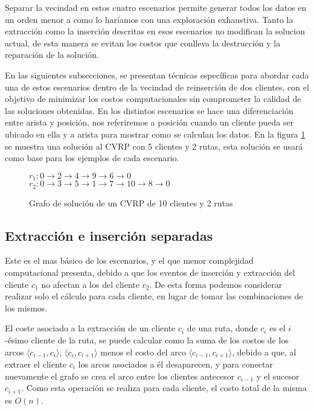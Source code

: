 \documentclass{article}
\begin{document}
Separar la vecindad en estos cuatro escenarios permite generar todos los datos en un orden menor a como lo haríamos con una exploración exhaustiva. Tanto la extracción como la inserción descritas en esos escenarios no modifican la solucion actual, de esta manera se evitan los costos que conlleva la destrucción y la reparación de la solución.

En las siguientes subsecciones, se presentan técnicas específicas para abordar cada una de estos escenarios dentro de la vecindad de reinserción de dos clientes, con el objetivo de minimizar los costos computacionales sin comprometer la calidad de las soluciones obtenidas. En los distintos escenarios se hace una diferenciación entre arista y posición, nos referiremos a posición cuando un cliente pueda ser ubicado en ella y a arista para mostrar como se calculan los datos. En la figura \ref{fig:Scenaries solution} se muestra una solución al CVRP con 5 clientes y 2 rutas, esta solución se usará como base para los ejemplos de cada escenario.

\begin{figure}[h]
	$r_1:0 \rightarrow 2 \rightarrow 4 \rightarrow 9 \rightarrow 6 \rightarrow 0$ \\
	$r_2:0 \rightarrow 3 \rightarrow 5 \rightarrow 1 \rightarrow 7 \rightarrow 10 \rightarrow 8 \rightarrow 0$ \\
	\caption{Grafo de solución de un CVRP de 10 clientes y 2 rutas}
	\label{fig:Scenaries solution}
\end{figure} 

\subsection{Extracción e inserción separadas}

Este es el mas básico de los escenarios, y el que menor complejidad computacional presenta, debido a que los eventos de inserción y extracción del cliente $c_1$ no afectan a los del cliente $c_2$. De esta forma podemos considerar realizar solo el cálculo para cada cliente, en lugar de tomar las combinaciones de los mismos. 

El coste asociado a la extracción de un cliente $c_i$ de una ruta, donde $c_i$ es el $i$-ésimo cliente de la ruta, se puede calcular como la suma de los costos de los arcos $\langle c_{i-1},c_i \rangle$, $\langle c_i,c_{i+1} \rangle$ menos el costo del arco $\langle c_{i-1}, c_{i+1} \rangle$, debido a que, al extraer el cliente $c_i$ los arcos asociados a él desaparecen, y para conectar nuevamente el grafo se crea el arco entre los clientes antecesor $c_{i-1}$ y el sucesor $c_{i+1}$. Como esta operación se realiza para cada cliente, el costo total de la misma es $O(n)$.
\end{document}
